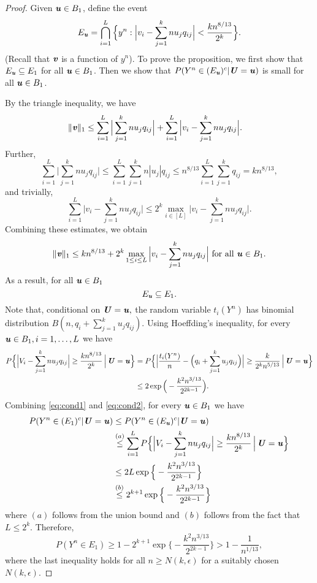 \documentclass[11pt,onecolumn]{IEEEtran}
\def\mathbi#1{{\textbf{\textit #1}}}
\begin{document}
\begin{proof}
Given $\mathbi{u}\in B_1$, define the event$$
E_{\mathbi{u}}= \bigcap_{i=1}^L \Big\{y^n : \Big| v_i - \sum_{j=1}^k n u_j q_{ij} \Big| < \frac{k n^{8/13}}{2^k} \Big\}.
$$
 (Recall that $\mathbi{v}$ is a function of $y^n$).
To prove the proposition, we first show that 
$E_{\mathbi{u}} \subseteq E_1$ for all $\mathbi{u}\in B_1$. Then we show that
$P(Y^n\in (E_{\mathbi{u}})^c|\mathbi{U}=\mathbi{u})$ is small for all $\mathbi{u}\in B_1$.

By the triangle inequality, we have
\begin{align*}
\|\mathbi{v}\|_1 & \le  \sum_{i=1}^L \Big| \sum_{j=1}^k n u_j q_{ij} \Big| +
\sum_{i=1}^L \Big|v_i - \sum_{j=1}^k n u_j q_{ij}  \Big|.
\end{align*}
Further,
$$
\sum_{i=1}^L \Big| \sum_{j=1}^k n u_j q_{ij} \Big| \le \sum_{i=1}^L \sum_{j=1}^k n |u_j| q_{ij} \le n^{8/13} \sum_{i=1}^L \sum_{j=1}^k  q_{ij}   =kn^{8/13},
$$
and trivially,
$$ \sum_{i=1}^L \Big|v_i - \sum_{j=1}^k n u_j q_{ij}  \Big|\le 2^k \max_{i\in[L]} \Big| v_i - \sum_{j=1}^k n u_j q_{ij} \Big|  .     
$$
Combining these estimates, we obtain
  $$
  \|\mathbi{v}\|_1\le kn^{8/13} +2^k \max_{1\le i\le L} \Big| v_i - \sum_{j=1}^k n u_j q_{ij}\Big|\text{~for all~}  \mathbi{u}\in B_1.
  $$
As a result, for all $\mathbi{u}\in B_1$
\begin{equation}\label{eq:cond1}
E_{\mathbi{u}} \subseteq E_1.
\end{equation}
Note that, conditional on $\mathbi{U}=\mathbi{u},$ the random variable $t_i(Y^n)$ has binomial distribution $B(n, q_i + \sum_{j=1}^k u_j q_{ij})$. Using Hoeffding's inequality, for every $\mathbi{u}\in B_1, i=1,\dots,L$ we have
\begin{align}
P \Big\{ \Big| V_i - \sum_{j=1}^k n u_j q_{ij} \Big| \ge \frac{k n^{8/13}}{2^k} \,\Big|\, \mathbi{U}=\mathbi{u} \Big\}
& = P \Big\{ \Big| \frac{t_i(Y^n)}{n} - \Big(q_i + \sum_{j=1}^k u_j q_{ij} \Big) \Big| \ge \frac{k }{2^k n^{5/13}} \,\Big|\, \mathbi{U}=\mathbi{u} \Big\}\nonumber \\
& \le 2 \exp\Big(- \frac{k^2 n^{3/13}}{2^{2k-1}}\Big).\label{eq:cond2}
\end{align}
Combining \eqref{eq:cond1} and \eqref{eq:cond2}, for every $\mathbi{u}\in B_1$ we have
    \begin{align*}
P(Y^n\in (E_1)^c|\mathbi{U}=\mathbi{u}) & \le
      P(Y^n\in (E_{\mathbi{u}})^c|\mathbi{U}=\mathbi{u}) \\
&  \overset{(a)}{\le} \sum_{i=1}^L  P \Big\{ \Big| V_i - \sum_{j=1}^k n u_j q_{ij} \Big| \ge \frac{k n^{8/13}}{2^k} \,\Big|\, \mathbi{U}=\mathbi{u} \Big\} \\
& \le 2L \exp\Big\{- \frac{k^2 n^{3/13}}{2^{2k-1}}\Big\} \\
& \overset{(b)}{\le} 2^{k+1} \exp\Big\{- \frac{k^2 n^{3/13}}{2^{2k-1}}\Big\}
\end{align*}
where $(a)$ follows from the union bound and $(b)$ follows from the fact that $L\le 2^k.$
Therefore,
$$
P(Y^n \in E_1) 
\ge 1 - 2^{k+1} \exp\Big\{- \frac{k^2 n^{3/13}}{2^{2k-1}}\Big\}
> 1 - \frac{1}{n^{1/13}},
$$
where the last inequality holds for all $n\ge N(k,\epsilon)$ for a suitably chosen $N(k,\epsilon)$.
\end{proof}
\end{document}
